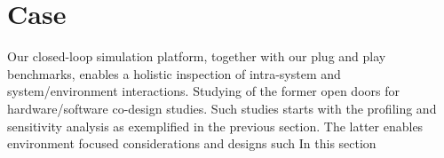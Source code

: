 \section{\DIFaddbegin {}\DIFaddend Case \DIFdelbegin {}\DIFdelend \DIFaddbegin {}\DIFaddend }
\label{sec:case-study}

Our closed-loop simulation platform, together with our plug and play benchmarks, enables a holistic inspection of intra-system and system/environment interactions. Studying of the former open doors for hardware/software co-design studies. Such studies starts with the profiling and sensitivity analysis as exemplified in the previous section. The latter enables environment focused considerations and designs such \DIFdelbegin {}\DIFdelend \DIFaddbegin {}\DIFaddend In this section \DIFdelbegin {}%
{%
}
